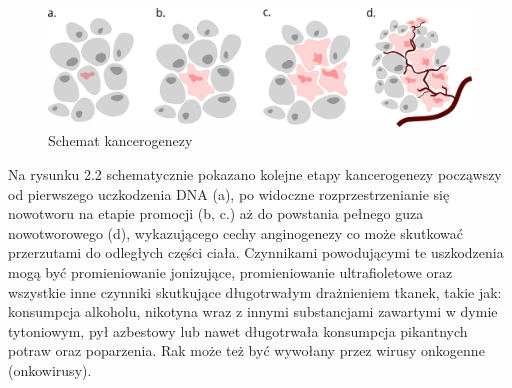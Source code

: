 \documentclass[a4paper,12pt,oneside]{book}
\begin{document}
\begin{figure}[h]
\centering
\includegraphics[scale=0.55]{SchematKancerogenezy.png}
\caption{Schemat kancerogenezy }
\end{figure}

Na rysunku 2.2 schematycznie pokazano kolejne etapy kancerogenezy począwszy od pierwszego uczkodzenia DNA (a), po widoczne rozprzestrzenianie się nowotworu na etapie promocji (b, c.) aż do powstania pełnego guza nowotworowego (d), wykazującego cechy anginogenezy co może skutkować przerzutami do odległych części ciała. 
Czynnikami powodującymi te uszkodzenia mogą być promieniowanie jonizujące, promieniowanie ultrafioletowe oraz wszystkie inne czynniki skutkujące długotrwałym drażnieniem tkanek, takie jak: konsumpcja alkoholu, nikotyna wraz z innymi substancjami zawartymi w dymie tytoniowym, pył azbestowy lub nawet długotrwała konsumpcja pikantnych potraw oraz poparzenia. Rak może też być wywołany przez wirusy onkogenne (onkowirusy).
\end{document}
